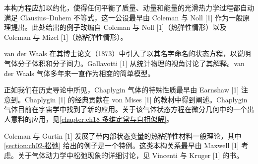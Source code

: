 \documentclass[../../main.tex]{subfiles}
\begin{document}
本构方程应加以约化，使得任何平衡了质量、动量和能量的光滑热力学过程都自动满足 Clausius--Duhem 不等式，这一公设最早由 Coleman 与 Noll [1] 作为一般原理提出。此处给出的例子改编自 Coleman 与 Noll [1]（热弹性情形）以及 Coleman 与 Mizel [1]（热粘弹性情形）。

van der Waals 在其博士论文（1873）中引入了以其名字命名的状态方程，以说明气体分子体积和分子间力。Gallavotti [1] 从统计物理的视角讨论了其解释。van der Waals 气体多年来一直作为相变的简单模型。

正如我们在历史导论中所见，Chaplygin 气体的特殊性质最早由 Earnshaw [1] 注意到。Chaplygin [1] 的经典贡献在 von Mises [1] 的教材中得到阐述。Chaplygin 气体目前在宇宙学中找到了新的应用。关于该气体状态方程在微分几何中的一个出人意料的应用，见\cref{chapter:ch18-多维定常与自相似解}。


Coleman 与 Gurtin [1] 发展了带内部状态变量的热粘弹性材料一般理论，其中\cref{section:ch02-松弛} 给出的例子是一个特例。这类本构关系最早由 Maxwell [1] 考虑。关于气体动力学中松弛现象的详细讨论，见 Vincenti 与 Kruger [1] 的书。
\end{document}
